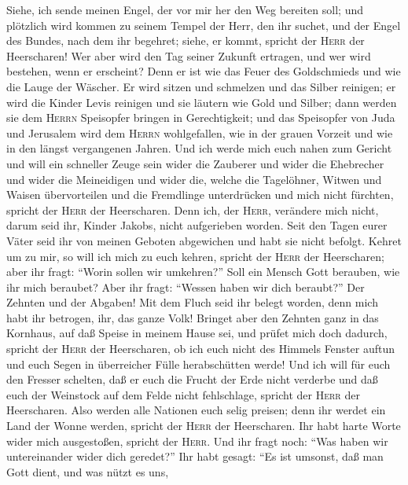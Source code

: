  Siehe, ich sende meinen Engel, der vor mir her den Weg
bereiten soll; und plötzlich wird kommen zu seinem Tempel der Herr, den
ihr suchet, und der Engel des Bundes, nach dem ihr begehret; siehe, er
kommt, spricht der \textsc{Herr} der Heerscharen!  Wer
aber wird den Tag seiner Zukunft ertragen, und wer wird bestehen, wenn
er erscheint? Denn er ist wie das Feuer des Goldschmieds und wie die
Lauge der Wäscher.  Er wird sitzen und schmelzen und das
Silber reinigen; er wird die Kinder Levis reinigen und sie läutern wie
Gold und Silber; dann werden sie dem \textsc{Herrn} Speisopfer bringen
in Gerechtigkeit;  und das Speisopfer von Juda und
Jerusalem wird dem \textsc{Herrn} wohlgefallen, wie in der grauen
Vorzeit und wie in den längst vergangenen Jahren.  Und ich
werde mich euch nahen zum Gericht und will ein schneller Zeuge sein
wider die Zauberer und wider die Ehebrecher und wider die Meineidigen
und wider die, welche die Tagelöhner, Witwen und Waisen übervorteilen
und die Fremdlinge unterdrücken und mich nicht fürchten, spricht der
\textsc{Herr} der Heerscharen.  Denn ich, der
\textsc{Herr}, verändere mich nicht, darum seid ihr, Kinder Jakobs,
nicht aufgerieben worden.  Seit den Tagen eurer Väter seid
ihr von meinen Geboten abgewichen und habt sie nicht befolgt. Kehret um
zu mir, so will ich mich zu euch kehren, spricht der \textsc{Herr} der
Heerscharen; aber ihr fragt: ``Worin sollen wir umkehren?''
 Soll ein Mensch Gott berauben, wie ihr mich beraubet?
Aber ihr fragt: ``Wessen haben wir dich beraubt?'' Der Zehnten und der
Abgaben!  Mit dem Fluch seid ihr belegt worden, denn mich
habt ihr betrogen, ihr, das ganze Volk!  Bringet aber den
Zehnten ganz in das Kornhaus, auf daß Speise in meinem Hause sei, und
prüfet mich doch dadurch, spricht der \textsc{Herr} der Heerscharen, ob
ich euch nicht des Himmels Fenster auftun und euch Segen in überreicher
Fülle herabschütten werde!  Und ich will für euch den
Fresser schelten, daß er euch die Frucht der Erde nicht verderbe und daß
euch der Weinstock auf dem Felde nicht fehlschlage, spricht der
\textsc{Herr} der Heerscharen.  Also werden alle Nationen
euch selig preisen; denn ihr werdet ein Land der Wonne werden, spricht
der \textsc{Herr} der Heerscharen.  Ihr habt harte Worte
wider mich ausgestoßen, spricht der \textsc{Herr}. Und ihr fragt noch:
``Was haben wir untereinander wider dich geredet?''  Ihr
habt gesagt: ``Es ist umsonst, daß man Gott dient, und was nützt es uns,
